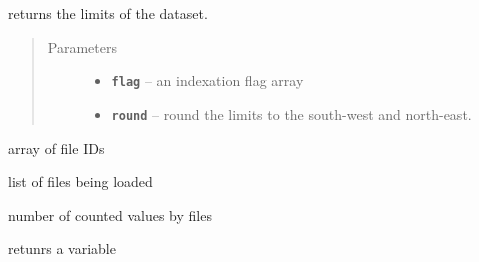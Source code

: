 \documentclass[letterpaper,10pt,english]{sphinxmanual}
\begin{document}
\begin{fulllineitems}
\begin{fulllineitems}
\label{altimetry.data:altimetry.data.hydro_data.extension}
returns the limits of the dataset.
\begin{quote}\begin{description}
\item[{Parameters}] \leavevmode\begin{itemize}
\item {} 
\textbf{\texttt{flag}} -- an indexation flag array

\item {} 
\textbf{\texttt{round}} -- round the limits to the south-west and north-east.

\end{itemize}

\end{description}\end{quote}

\end{fulllineitems}


\begin{fulllineitems}
\label{altimetry.data:altimetry.data.hydro_data.fileid}
array of file IDs

\end{fulllineitems}


\begin{fulllineitems}
\label{altimetry.data:altimetry.data.hydro_data.filelist}
list of files being loaded

\end{fulllineitems}


\begin{fulllineitems}
\label{altimetry.data:altimetry.data.hydro_data.filelist_count}
number of counted values by files

\end{fulllineitems}


\begin{fulllineitems}
\label{altimetry.data:altimetry.data.hydro_data.get}
retunrs a variable


\end{fulllineitems}
\end{fulllineitems}
\end{document}
